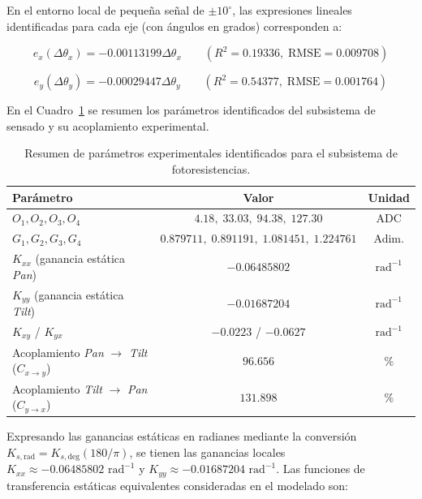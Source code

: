 \documentclass[12pt,a4paper]{article}
\begin{document}
En el entorno local de pequeña señal de $\pm 10^\circ$, las expresiones lineales identificadas para cada eje (con ángulos en grados) corresponden a:

\begin{equation}
e_x(\Delta\theta_x) = -0.00113199\Delta\theta_x \qquad (R^2 = 0.19336,\; \text{RMSE} = 0.009708)
\end{equation}

\begin{equation}
e_y(\Delta\theta_y) = -0.00029447\Delta\theta_y \qquad (R^2 = 0.54377,\; \text{RMSE} = 0.001764)
\end{equation}

En el Cuadro~\ref{tab:parametros_ldr} se resumen los parámetros identificados del subsistema de sensado y su acoplamiento experimental.

\begin{table}[H]
    \centering
    \caption{Resumen de parámetros experimentales identificados para el subsistema de fotoresistencias.}
    \label{tab:parametros_ldr}
    \begin{tabular}{lcc}
        \toprule
        \textbf{Parámetro} & \textbf{Valor} & \textbf{Unidad} \\
        \midrule
        $O_1, O_2, O_3, O_4$ & $4.18,\; 33.03,\; 94.38,\; 127.30$ & $\text{ADC}$ \\
        $G_1, G_2, G_3, G_4$ & $0.879711,\; 0.891191,\; 1.081451,\; 1.224761$ & Adim. \\
        $K_{xx}$ (ganancia estática \emph{Pan}) & $-0.06485802$ & $\text{rad}^{-1}$ \\
        $K_{yy}$ (ganancia estática \emph{Tilt}) & $-0.01687204$ & $\text{rad}^{-1}$ \\
        $K_{xy}$ / $K_{yx}$ & $-0.0223$ / $-0.0627$ & $\text{rad}^{-1}$ \\
        Acoplamiento \emph{Pan} $\rightarrow$ \emph{Tilt} ($C_{x\rightarrow y}$) & $96.656$ & $\%$ \\
        Acoplamiento \emph{Tilt} $\rightarrow$ \emph{Pan} ($C_{y\rightarrow x}$) & $131.898$ & $\%$ \\
        \bottomrule
    \end{tabular}
\end{table}

Expresando las ganancias estáticas en radianes mediante la conversión $K_{s,\mathrm{rad}} = K_{s,\mathrm{deg}}(180/\pi)$, se tienen las ganancias locales $K_{xx} \approx -0.06485802\text{ rad}^{-1}$ y $K_{yy} \approx -0.01687204\text{ rad}^{-1}$. Las funciones de transferencia estáticas equivalentes consideradas en el modelado son:
\end{document}
